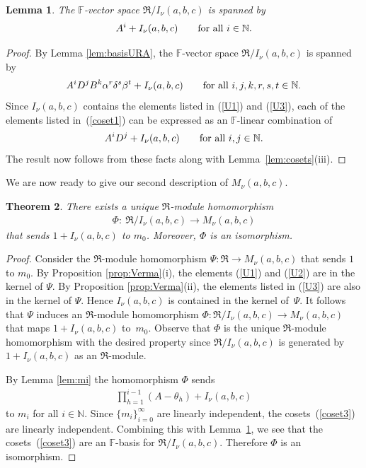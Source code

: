 \documentclass[pdftex]{sigma}
\def\N{\mathbb N}
\def\F{\mathbb F}
\numberwithin{equation}{section}
\newtheorem{Theorem}{Theorem}[section]
\newtheorem{Lemma}[Theorem]{Lemma}
\begin{document}
\begin{Lemma}\label{lem:R/I_basis}The $\F$-vector space $\Re/I_\nu(a,b,c)$ is spanned by
\begin{gather*}
A^i+I_\nu(a,b,c) \qquad \hbox{for all $i\in \N$}.
\end{gather*}
\end{Lemma}
\begin{proof}By Lemma \ref{lem:basisURA}, the $\F$-vector space $\Re/I_\nu(a,b,c)$ is spanned by
\begin{gather}\label{coset1}
A^i D^j B^k \alpha^r \delta^s \beta^t+I_\nu(a,b,c)\qquad \hbox{for all $i,j,k,r,s,t\in \N$}.
\end{gather}
Since $I_\nu(a,b,c)$ contains the elements listed in (\ref{U1}) and (\ref{U3}), each of the elements listed in~(\ref{coset1}) can be expressed as an $\F$-linear combination of
\begin{gather*}%
A^i D^j+I_\nu(a,b,c) \qquad \hbox{for all $i,j\in \N$}.
\end{gather*}
The result now follows from these facts along with Lemma~\ref{lem:cosets}(iii).
\end{proof}

We are now ready to give our second description of $M_\nu(a,b,c)$.

\begin{Theorem}\label{thm:M=R/I}There exists a unique $\Re$-module homomorphism
\begin{gather*}
\Phi\colon \ \Re/I_\nu(a,b,c)\to M_\nu(a,b,c)
\end{gather*}
that sends $1+I_\nu(a,b,c)$ to $m_0$. Moreover, $\Phi$ is an isomorphism.
\end{Theorem}
\begin{proof}Consider the $\Re$-module homomorphism $\Psi\colon \Re\to M_\nu(a,b,c)$ that sends $1$ to $m_0$. By Proposition \ref{prop:Verma}(i), the elements (\ref{U1}) and (\ref{U2}) are in the kernel of $\Psi$. By Proposition \ref{prop:Verma}(ii), the elements listed in (\ref{U3}) are also in the kernel of $\Psi$. Hence $I_\nu(a,b,c)$ is contained in the kernel of~$\Psi$. It follows that $\Psi$ induces an $\Re$-module homomorphism $\Phi\colon \Re/I_\nu(a,b,c) \to M_\nu(a,b,c)$ that maps $1+I_\nu(a,b,c)$ to~$m_0$. Observe that $\Phi$ is the unique $\Re$-module homomorphism with the desired property since $\Re/I_\nu(a,b,c)$ is generated by $1+I_\nu(a,b,c)$ as an $\Re$-module.

By Lemma \ref{lem:mi} the homomorphism $\Phi$ sends
\begin{gather}\label{coset3}
\prod_{h=1}^{i-1}(A-\theta_h)+I_\nu(a,b,c)
\end{gather}
to $m_i$ for all $i\in \N$. Since $\{m_i\}_{i=0}^\infty$ are linearly independent, the cosets~(\ref{coset3}) are linearly independent. Combining this with Lemma~\ref{lem:R/I_basis}, we see that the cosets~(\ref{coset3}) are an $\F$-basis for $\Re/I_\nu(a,b,c)$. Therefore $\Phi$ is an isomorphism.
\end{proof}
\end{document}
